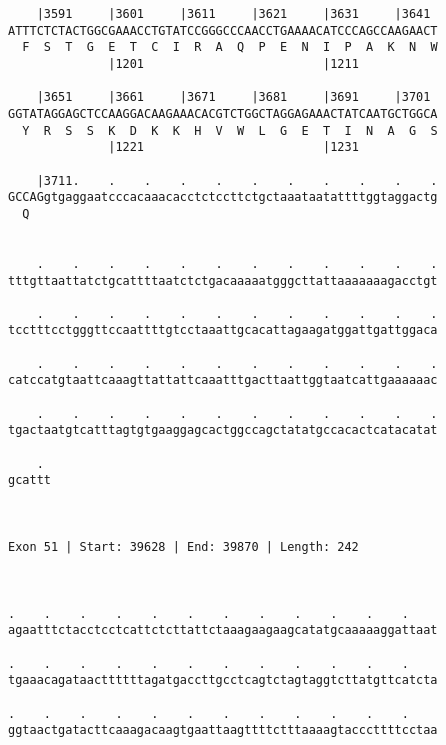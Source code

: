 \documentclass{article}
\begin{document}
\begin{Verbatim}
    |3591     |3601     |3611     |3621     |3631     |3641 
ATTTCTCTACTGGCGAAACCTGTATCCGGGCCCAACCTGAAAACATCCCAGCCAAGAACT
  F  S  T  G  E  T  C  I  R  A  Q  P  E  N  I  P  A  K  N  W
              |1201                         |1211           
  
    |3651     |3661     |3671     |3681     |3691     |3701 
GGTATAGGAGCTCCAAGGACAAGAAACACGTCTGGCTAGGAGAAACTATCAATGCTGGCA
  Y  R  S  S  K  D  K  K  H  V  W  L  G  E  T  I  N  A  G  S
              |1221                         |1231           
  
    |3711.    .    .    .    .    .    .    .    .    .    .
GCCAGgtgaggaatcccacaaacacctctccttctgctaaataatattttggtaggactg
  Q                                                         
                                                            
  
    .    .    .    .    .    .    .    .    .    .    .    .
tttgttaattatctgcattttaatctctgacaaaaatgggcttattaaaaaaagacctgt
                                                            
    .    .    .    .    .    .    .    .    .    .    .    .
tcctttcctgggttccaattttgtcctaaattgcacattagaagatggattgattggaca
                                                            
    .    .    .    .    .    .    .    .    .    .    .    .
catccatgtaattcaaagttattattcaaatttgacttaattggtaatcattgaaaaaac
                                                            
    .    .    .    .    .    .    .    .    .    .    .    .
tgactaatgtcatttagtgtgaaggagcactggccagctatatgccacactcatacatat
                                                            
    . 
gcattt
      
      
 
Exon 51 | Start: 39628 | End: 39870 | Length: 242



.    .    .    .    .    .    .    .    .    .    .    .    
agaatttctacctcctcattctcttattctaaagaagaagcatatgcaaaaaggattaat
                                                            
.    .    .    .    .    .    .    .    .    .    .    .    
tgaaacagataacttttttagatgaccttgcctcagtctagtaggtcttatgttcatcta
                                                            
.    .    .    .    .    .    .    .    .    .    .    .    
ggtaactgatacttcaaagacaagtgaattaagttttctttaaaagtacccttttcctaa
                                                            

\end{Verbatim}
\end{document}
